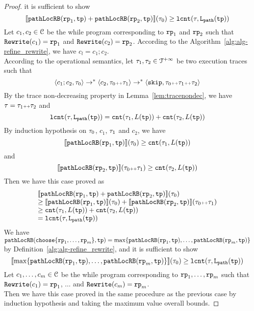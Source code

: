 \begin{proof}
it is sufficient to show
\[
  \llbracket \mathtt{pathLocRB}(\mathtt{rp}_1, \mathtt{tp}) + \mathtt{pathLocRB}(\mathtt{rp}_2, \mathtt{tp}) \rrbracket(\mathtt{\tau}_0) \geq \mathtt{lcnt}(\mathtt{\tau}, \mathtt{L}_{\mathtt{path}}(\mathtt{tp})) 
\]
Let $c_1, c_2 \in \mathcal{C}$ be the while program corresponding to $\mathtt{rp}_1$ and $\mathtt{rp}_2$ such that $\mathtt{Rewrite}(c_1) = \mathtt{rp}_1$ and $\mathtt{Rewrite}(c_2) = \mathtt{rp}_2$.
According to the Algorithm~\ref{alg:alg-refine_rewrite}, we have $c_l = c_1; c_2$.
\\
According to the operational semantics, let $\mathtt{\tau}_1, \mathtt{\tau}_2 \in \mathcal{T}^{+\infty}$ be two execution traces such that 
\[
  \langle c_1; c_2, \mathtt{\tau}_0 \rangle \to^* \langle c_2, \mathtt{\tau}_0 {\scriptscriptstyle ++} \mathtt{\tau}_1 \rangle \to^* \langle \mathtt{skip}, \mathtt{\tau}_0 {\scriptscriptstyle ++} \mathtt{\tau}_1 {\scriptscriptstyle ++} \mathtt{\tau}_2 \rangle
\]
By the trace non-decreasing property in Lemma~\ref{lem:tracenondec}, we have $\mathtt{\tau} = \mathtt{\tau}_1 {\scriptscriptstyle ++} \mathtt{\tau}_2$ and 
\[
  \mathtt{lcnt}(\mathtt{\tau}, \mathtt{L}_{\mathtt{path}}(\mathtt{tp}))  = \mathtt{cnt}(\mathtt{\tau}_1, L(\mathtt{tp}))  + \mathtt{cnt}(\mathtt{\tau}_2, L(\mathtt{tp})) 
\]
By induction hypothesis on $\mathtt{\tau}_0$, $c_1$, $\mathtt{\tau}_1$ and $c_2$, we have
\[
  \llbracket \mathtt{pathLocRB}(\mathtt{rp}_1, \mathtt{tp}) \rrbracket(\mathtt{\tau}_0) \geq \mathtt{cnt}(\mathtt{\tau}_1, L(\mathtt{tp})) 
\]
 and 
  \[
    \llbracket \mathtt{pathLocRB}(\mathtt{rp}_2, \mathtt{tp}) \rrbracket(\mathtt{\tau}_0 {\scriptscriptstyle ++} \mathtt{\tau}_1) \geq \mathtt{cnt}(\mathtt{\tau}_2, L(\mathtt{tp})) 
  \]
Then we have this case proved as
\[
  \begin{array}{l}
  \llbracket \mathtt{pathLocRB}(\mathtt{rp}_1, \mathtt{tp}) + \mathtt{pathLocRB}(\mathtt{rp}_2, \mathtt{tp}) \rrbracket(\mathtt{\tau}_0)
  \\
  \geq \llbracket \mathtt{pathLocRB}(\mathtt{rp}_1, \mathtt{tp}) \rrbracket(\mathtt{\tau}_0) + \llbracket \mathtt{pathLocRB}(\mathtt{rp}_2, \mathtt{tp}) \rrbracket(\mathtt{\tau}_0 {\scriptscriptstyle ++} \mathtt{\tau}_1)
  \\
  \geq \mathtt{cnt}(\mathtt{\tau}_1, L(\mathtt{tp}))  + \mathtt{cnt}(\mathtt{\tau}_2, L(\mathtt{tp})) 
  \\
  = \mathtt{lcnt}(\mathtt{\tau}, \mathtt{L}_{\mathtt{path}}(\mathtt{tp}))
  \end{array}
  \] 
We have $\outinB(\rpchoose{\rprog_1, \ldots, \rprog_m }, \tpath) = \max\left\{ \outinB(\rprog_1, \tpath), \ldots, \outinB(\rprog_m, \tpath) \right\}$ by Definition~\ref{alg:alg-refine_rewrite}, and
it is sufficient to show
\[
  \econfig{\max\left\{ \outinB(\rprog_1, \tpath), \ldots, \outinB(\rprog_m, \tpath) \right\}}(\trace_0) \geq \lcounter(\trace, \pathl(\tpath)) 
\]
Let $c_1, \ldots, c_m \in \mathcal{C}$ be the while program corresponding to $\mathtt{rp}_1, \ldots, \mathtt{rp}_m$ such that $\mathtt{Rewrite}(c_1) = \mathtt{rp}_1$, $\ldots$ and  $\mathtt{Rewrite}(c_m) = \mathtt{rp}_m$.
\\
Then we have this case proved in the same procedure as the previous case by induction hypothesis and taking the maximum value overall bounds.

\end{proof}
